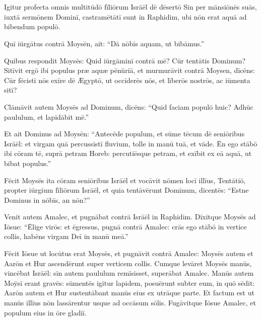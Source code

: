 \chapter{}


\thispagestyle{empty}


Igitur profecta omnis multitūdō fīliōrum Isrāēl dē
dēsertō Sīn per mānsiōnēs suās, iuxtā sermōnem Dominī,
castramētātī sunt in Raphidim, ubi nōn
erat aquā ad bibendum populō. 

Quī iūrgātus contrā
Moysēn, ait: ``Dā nōbīs aquam, ut bibāmus.''

Quibus respondit Moysēs: Quid iūrgāminī contrā mē? Cūr
tentātis Dominum? 
Sitīvit ergō ibi populus præ aquæ pēnūriā, et
murmurāvit contrā Moysen,
dīcēns: Cūr fēcistī nōs exīre dē Ægyptō, ut occīderēs nōs, et līberōs
nostrōs, ac iūmenta sitī? 

Clāmāvit autem Moysēs ad
Dominum, dīcēns: ``Quid faciam populō huic? Adhūc paululum,
et lapidābit mē.''

Et ait Dominus ad Moysēn:
``Antecēde populum, et sūme tēcum dē seniōribus Isrāēl: et
virgam quā percussistī fluvium, tolle in manū tuā, et vāde. 
Ēn ego stābō ibi cōram tē, suprā petram
Horeb: percutiēsque petram, et exībit ex eā aquā, ut bibat
populus.''

Fēcit Moysēs ita cōram seniōribus Isrāēl 
et vocāvit nōmen locī
illīus, Tentātiō, propter iūrgium fīliōrum
Isrāēl, et quia tentāvērunt Dominum, dīcentēs: ``Estne Dominus in nōbīs, an
nōn?''

Venit autem Amalec, et pugnābat contrā Isrāēl in Raphidim.
Dīxitque Moysēs ad Iōsue: ``Ēlige virōs: et ēgressus, pugnā contrā Amalec:
crās ego stābō in vertice collis, habēns virgam Deī in manū
meā.''

Fēcit Iōsue ut locūtus erat Moysēs, et pugnāvit contrā Amalec:
Moysēs autem et Aarōn et Hur ascendērunt super verticem
collis. 
Cumque levāret Moysēs manūs, vincēbat Isrāēl: sīn autem
paululum remīsisset, superābat Amalec. 
Manūs autem Moȳsī
erant gravēs: sūmentēs igitur lapidem, posuērunt
subter eum, in quō sēdit: Aarōn autem et Hur
sustentābant manūs eius ex utrāque parte. Et factum est ut
manūs illīus nōn lassārentur usque ad occāsum sōlis. 
Fugāvitque Iōsue Amalec, et populum eius in ōre gladiī. 

